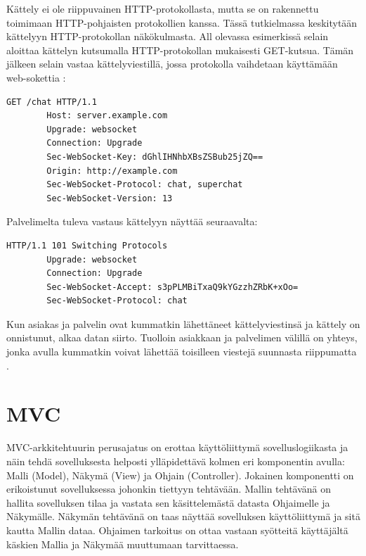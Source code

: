 \documentclass[utf8]{gradu3}
\begin{document}
Kättely ei ole riippuvainen HTTP-protokollasta, mutta se on rakennettu toimimaan HTTP-pohjaisten protokollien kanssa. Tässä tutkielmassa keskitytään kättelyyn HTTP-protokollan näkökulmasta. All olevassa esimerkissä selain aloittaa kättelyn kutsumalla HTTP-protokollan mukaisesti GET-kutsua. Tämän jälkeen selain vastaa kättelyviestillä, jossa protokolla vaihdetaan käyttämään web-sokettia \parencite[s. 1.1]{websocket}:

\begin{lstlisting}[language=Smalltalk]
        GET /chat HTTP/1.1
        Host: server.example.com
        Upgrade: websocket
        Connection: Upgrade
        Sec-WebSocket-Key: dGhlIHNhbXBsZSBub25jZQ==
        Origin: http://example.com
        Sec-WebSocket-Protocol: chat, superchat
        Sec-WebSocket-Version: 13
\end{lstlisting}

Palvelimelta tuleva vastaus kättelyyn näyttää seuraavalta:
\begin{lstlisting}[language=Smalltalk]
         HTTP/1.1 101 Switching Protocols
        Upgrade: websocket
        Connection: Upgrade
        Sec-WebSocket-Accept: s3pPLMBiTxaQ9kYGzzhZRbK+xOo=
        Sec-WebSocket-Protocol: chat
\end{lstlisting}

Kun asiakas ja palvelin ovat kummatkin lähettäneet kättelyviestinsä ja kättely on onnistunut, alkaa datan siirto. Tuolloin asiakkaan ja palvelimen välillä on yhteys, jonka avulla kummatkin voivat lähettää toisilleen viestejä suunnasta riippumatta \parencite[s. 1.2]{websocket}. 


\chapter{MVC}
MVC-arkkitehtuurin perusajatus on erottaa käyttöliittymä sovelluslogiikasta ja
näin tehdä sovelluksesta helposti ylläpidettävä kolmen eri komponentin avulla:
Malli (Model), Näkymä (View) ja Ohjain (Controller). Jokainen komponentti on
erikoistunut sovelluksessa johonkin tiettyyn tehtävään. Mallin tehtävänä on
hallita sovelluksen tilaa ja vastata sen käsittelemästä datasta Ohjaimelle ja Näkymälle.
Näkymän tehtävänä on taas näyttää sovelluksen käyttöliittymä ja sitä kautta Mallin dataa. 
Ohjaimen tarkoitus on ottaa vastaan syötteitä käyttäjältä käskien Mallia ja Näkymää muuttumaan tarvittaessa.
\end{document}
